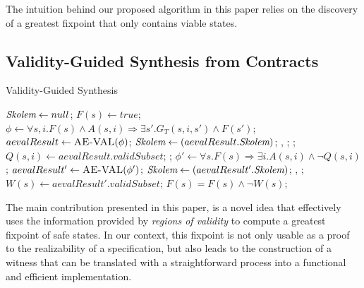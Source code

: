 The intuition behind our proposed algorithm in this paper relies on the
discovery of a greatest fixpoint that only contains viable states.


\subsection{Validity-Guided Synthesis from Contracts}
\label{sec:synth}

\begin{algorithm*}[!t]
\footnotesize
\caption{Validity-Guided Synthesis}\label{alg:synthesis}
\begin{algorithmic}[1]
	\State $\textit{Skolem} \gets null$;
	\State $F(s) \gets true$;
		\State $\phi \gets \forall s,i. F(s) \land A(s,i) \Rightarrow \exists s'.
			G_{T}(s,i,s') \land F(s')$;
		\State $aevalResult \gets \textsc{AE-VAL}(\phi)$;
			\State $\textit{Skolem} \gets (aevalResult.\textit{Skolem})$;
				\Return \realizable, %
		 		\skolems;
			\Else{}
		 		\Return \unrealizable;
		 	\EndIf
		\Else
			\State $Q(s,i) \gets aevalResult.validSubset$;
				\Return \unrealizable;
			\EndIf
			\State $\phi' \gets \forall s. F(s) \Rightarrow \exists i. A(s,i) \land \lnot
			Q(s,i)$;
			\State $aevalResult' \gets \textsc{AE-VAL}(\phi')$;
				\State $\textit{Skolem} \gets (aevalResult'.\textit{Skolem})$;
				\Return \unrealizable, \skolems;
			\Else{}
				\State $W(s) \gets aevalResult'.validSubset$;
				\State $F(s) = F(s) \land \lnot W(s)$;
			\EndIf
		\EndIf
	\EndWhile
\EndProcedure
\end{algorithmic}
\end{algorithm*}

The main contribution presented in this paper, is a novel idea that effectively
uses the information provided by \textit{regions of validity} to compute a
greatest fixpoint of safe states. In our context, this fixpoint is not only
usable as a proof to the realizability of a specification, but also leads to the
construction of a witness that can be translated with a straightforward process
into a functional and efficient implementation.

